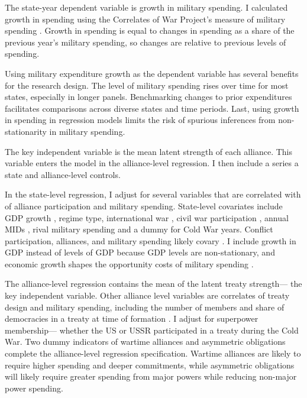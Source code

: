 \documentclass[12pt]{article}
\begin{document}
The state-year dependent variable is growth in military spending.
I calculated growth in spending using the Correlates of War Project's measure of military spending \citep{SingerCINC1988}. 
Growth in spending is equal to changes in spending as a share of the previous year's military spending, so changes are relative to previous levels of spending. 


Using military expenditure growth as the dependent variable has several benefits for the research design. 
The level of military spending rises over time for most states, especially in longer panels. 
Benchmarking changes to prior expenditures facilitates comparisons across diverse states and time periods. 
Last, using growth in spending in regression models limits the risk of spurious inferences from non-stationarity in military spending.


The key independent variable is the mean latent strength of each alliance. 
This variable enters the model in the alliance-level regression. 
I then include a series a state and alliance-level controls. 


In the state-level regression, I adjust for several variables that are correlated with of alliance participation and military spending. 
State-level covariates include GDP growth \citep{Boltetal2018}, regime type, international war \citep{Reiteretal2016}, civil war participation \citep{SarkeesWayman2010}, annual MIDs \citep{Gibleretal2016}, rival military spending \citep{ThompsonDreyer2012} and a dummy for Cold War years.
Conflict participation, alliances, and military spending likely covary \citep{SeneseVasquez2008}. 
I include growth in GDP instead of levels of GDP because GDP levels are non-stationary, and economic growth shapes the opportunity costs of military spending \citep{Kimball2010, Zielinskietal2017}.


The alliance-level regression contains the mean of the latent treaty strength--- the key independent variable. 
Other alliance level variables are correlates of treaty design and military spending, including the number of members and share of democracies in a treaty at time of formation \citep{Chibaetal2015}.
I adjust for superpower membership--- whether the US or USSR participated in a treaty during the Cold War. 
Two dummy indicators of wartime alliances and asymmetric obligations \citep{Leedsetal2002} complete the alliance-level regression specification. 
Wartime alliances are likely to require higher spending and deeper commitments, while asymmetric obligations will likely require greater spending from major powers while reducing non-major power spending. 
\end{document}
